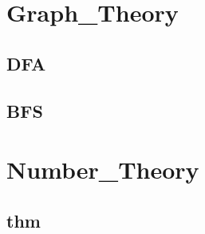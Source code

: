 \section{Graph_Theory}
    \subsection{DFA}
        
    \subsection{BFS}
        

\section{Number_Theory}
    \subsection{thm}
        